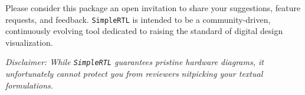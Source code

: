 Please consider this package an open invitation to share your suggestions, feature requests, and feedback. \texttt{SimpleRTL} is intended to be a community-driven, continuously evolving tool dedicated to raising the standard of digital design visualization.
    
\textit{Disclaimer: While \texttt{SimpleRTL} guarantees pristine hardware diagrams, it unfortunately cannot protect you from reviewers nitpicking your textual formulations.}

 